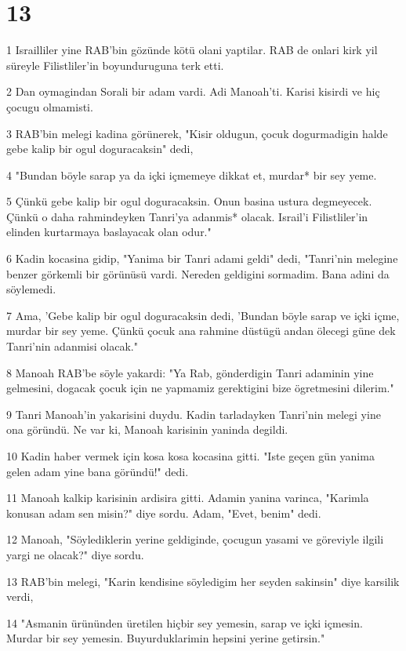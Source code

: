 \chapter{13}

\par 1 Israilliler yine RAB'bin gözünde kötü olani yaptilar. RAB de onlari kirk yil süreyle Filistliler'in boyunduruguna terk etti.
\par 2 Dan oymagindan Sorali bir adam vardi. Adi Manoah'ti. Karisi kisirdi ve hiç çocugu olmamisti.
\par 3 RAB'bin melegi kadina görünerek, "Kisir oldugun, çocuk dogurmadigin halde gebe kalip bir ogul doguracaksin" dedi,
\par 4 "Bundan böyle sarap ya da içki içmemeye dikkat et, murdar* bir sey yeme.
\par 5 Çünkü gebe kalip bir ogul doguracaksin. Onun basina ustura degmeyecek. Çünkü o daha rahmindeyken Tanri'ya adanmis* olacak. Israil'i Filistliler'in elinden kurtarmaya baslayacak olan odur."
\par 6 Kadin kocasina gidip, "Yanima bir Tanri adami geldi" dedi, "Tanri'nin melegine benzer görkemli bir görünüsü vardi. Nereden geldigini sormadim. Bana adini da söylemedi.
\par 7 Ama, 'Gebe kalip bir ogul doguracaksin dedi, 'Bundan böyle sarap ve içki içme, murdar bir sey yeme. Çünkü çocuk ana rahmine düstügü andan ölecegi güne dek Tanri'nin adanmisi olacak."
\par 8 Manoah RAB'be söyle yakardi: "Ya Rab, gönderdigin Tanri adaminin yine gelmesini, dogacak çocuk için ne yapmamiz gerektigini bize ögretmesini dilerim."
\par 9 Tanri Manoah'in yakarisini duydu. Kadin tarladayken Tanri'nin melegi yine ona göründü. Ne var ki, Manoah karisinin yaninda degildi.
\par 10 Kadin haber vermek için kosa kosa kocasina gitti. "Iste geçen gün yanima gelen adam yine bana göründü!" dedi.
\par 11 Manoah kalkip karisinin ardisira gitti. Adamin yanina varinca, "Karimla konusan adam sen misin?" diye sordu. Adam, "Evet, benim" dedi.
\par 12 Manoah, "Söylediklerin yerine geldiginde, çocugun yasami ve göreviyle ilgili yargi ne olacak?" diye sordu.
\par 13 RAB'bin melegi, "Karin kendisine söyledigim her seyden sakinsin" diye karsilik verdi,
\par 14 "Asmanin ürününden üretilen hiçbir sey yemesin, sarap ve içki içmesin. Murdar bir sey yemesin. Buyurduklarimin hepsini yerine getirsin."
